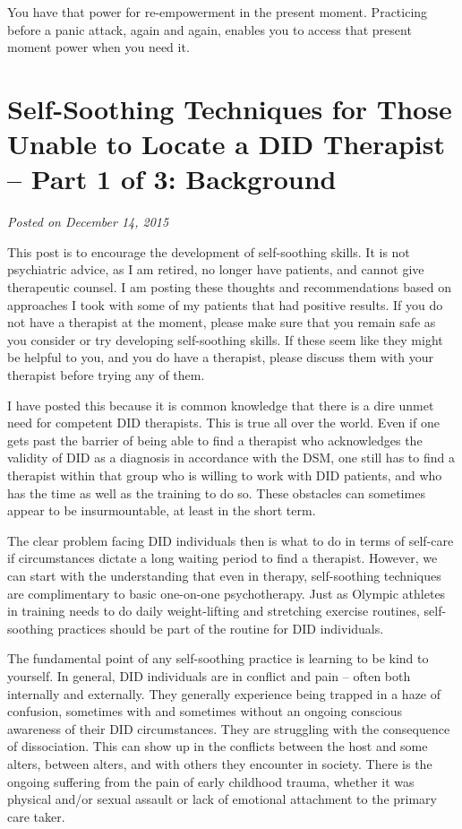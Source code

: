 \documentclass[]{book}
\begin{document}
You have that power for re-empowerment in the present moment. Practicing before a panic attack, again and again, enables you to access that present moment power when you need it.

\hypertarget{self-soothing-techniques-for-those-unable-to-locate-a-did-therapist-part-1-of-3-background}{%
\section{Self-Soothing Techniques for Those Unable to Locate a DID Therapist -- Part 1 of 3: Background}\label{self-soothing-techniques-for-those-unable-to-locate-a-did-therapist-part-1-of-3-background}}

\emph{Posted on December 14, 2015}

This post is to encourage the development of self-soothing skills. It is not psychiatric advice, as I am retired, no longer have patients, and cannot give therapeutic counsel. I am posting these thoughts and recommendations based on approaches I took with some of my patients that had positive results. If you do not have a therapist at the moment, please make sure that you remain safe as you consider or try developing self-soothing skills. If these seem like they might be helpful to you, and you do have a therapist, please discuss them with your therapist before trying any of them.

I have posted this because it is common knowledge that there is a dire unmet need for competent DID therapists. This is true all over the world. Even if one gets past the barrier of being able to find a therapist who acknowledges the validity of DID as a diagnosis in accordance with the DSM, one still has to find a therapist within that group who is willing to work with DID patients, and who has the time as well as the training to do so. These obstacles can sometimes appear to be insurmountable, at least in the short term.

The clear problem facing DID individuals then is what to do in terms of self-care if circumstances dictate a long waiting period to find a therapist. However, we can start with the understanding that even in therapy, self-soothing techniques are complimentary to basic one-on-one psychotherapy. Just as Olympic athletes in training needs to do daily weight-lifting and stretching exercise routines, self-soothing practices should be part of the routine for DID individuals.

The fundamental point of any self-soothing practice is learning to be kind to yourself. In general, DID individuals are in conflict and pain -- often both internally and externally. They generally experience being trapped in a haze of confusion, sometimes with and sometimes without an ongoing conscious awareness of their DID circumstances. They are struggling with the consequence of dissociation. This can show up in the conflicts between the host and some alters, between alters, and with others they encounter in society. There is the ongoing suffering from the pain of early childhood trauma, whether it was physical and/or sexual assault or lack of emotional attachment to the primary care taker.
\end{document}
